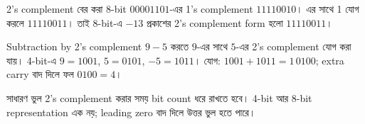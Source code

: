 \begin{examplebox}{2's complement বের করা}
8-bit $00001101$-এর 1's complement $11110010$। এর সাথে 1 যোগ করলে $11110011$। তাই 8-bit-এ $-13$ প্রকাশের 2's complement form হলো $11110011$।
\end{examplebox}

\begin{examplebox}{Subtraction by 2's complement}
$9-5$ করতে $9$-এর সাথে $5$-এর 2's complement যোগ করা যায়। 4-bit-এ $9=1001$, $5=0101$, $-5=1011$। যোগ: $1001+1011=1\,0100$; extra carry বাদ দিলে ফল $0100=4$।
\end{examplebox}

\begin{mistakebox}{সাধারণ ভুল}
2's complement করার সময় bit count ধরে রাখতে হবে। 4-bit আর 8-bit representation এক নয়; leading zero বাদ দিলে উত্তর ভুল হতে পারে।
\end{mistakebox}
